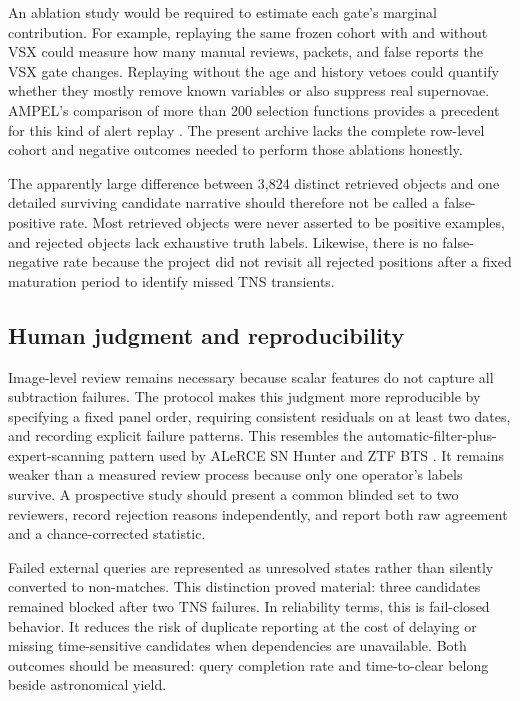 \documentclass[11pt]{article}
\begin{document}
An ablation study would be required to estimate each gate's marginal contribution. For example, replaying the same frozen cohort with and without VSX could measure how many manual reviews, packets, and false reports the VSX gate changes. Replaying without the age and history vetoes could quantify whether they mostly remove known variables or also suppress real supernovae. AMPEL's comparison of more than 200 selection functions provides a precedent for this kind of alert replay \citep{nordin2019}. The present archive lacks the complete row-level cohort and negative outcomes needed to perform those ablations honestly.

The apparently large difference between 3,824 distinct retrieved objects and one detailed surviving candidate narrative should therefore not be called a false-positive rate. Most retrieved objects were never asserted to be positive examples, and rejected objects lack exhaustive truth labels. Likewise, there is no false-negative rate because the project did not revisit all rejected positions after a fixed maturation period to identify missed TNS transients.

\subsection{Human judgment and reproducibility}

Image-level review remains necessary because scalar features do not capture all subtraction failures. The protocol makes this judgment more reproducible by specifying a fixed panel order, requiring consistent residuals on at least two dates, and recording explicit failure patterns. This resembles the automatic-filter-plus-expert-scanning pattern used by ALeRCE SN Hunter and ZTF BTS \citep{carrascodavis2021,fremling2020}. It remains weaker than a measured review process because only one operator's labels survive. A prospective study should present a common blinded set to two reviewers, record rejection reasons independently, and report both raw agreement and a chance-corrected statistic.

Failed external queries are represented as unresolved states rather than silently converted to non-matches. This distinction proved material: three candidates remained blocked after two TNS failures. In reliability terms, this is fail-closed behavior. It reduces the risk of duplicate reporting at the cost of delaying or missing time-sensitive candidates when dependencies are unavailable. Both outcomes should be measured: query completion rate and time-to-clear belong beside astronomical yield.
\end{document}

